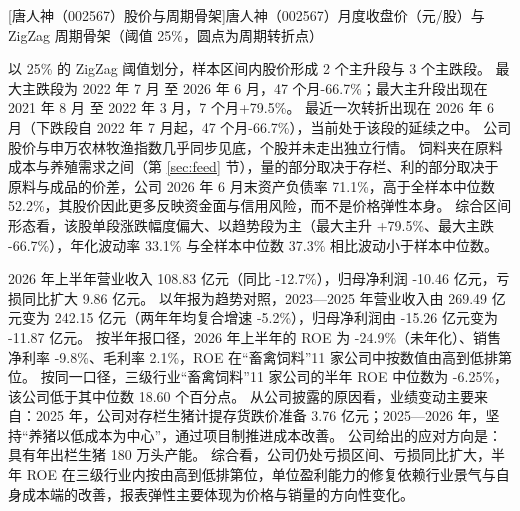 \begin{center}
\begin{minipage}{\textwidth}\centering
{}

[唐人神（002567）股价与周期骨架]{唐人神（002567）月度收盘价（元/股）与 ZigZag 周期骨架（阈值 25\%，圆点为周期转折点）}
\end{minipage}
\end{center}

 以 25\% 的 ZigZag 阈值划分，样本区间内股价形成 2 个主升段与 3 个主跌段。 最大主跌段为 2022 年 7 月 至 2026 年 6 月，47 个月-66.7\%；最大主升段出现在 2021 年 8 月 至 2022 年 3 月，7 个月+79.5\%。 最近一次转折出现在 2026 年 6 月（下跌段自 2022 年 7 月起，47 个月-66.7\%），当前处于该段的延续之中。 公司股价与申万农林牧渔指数几乎同步见底，个股并未走出独立行情。 饲料夹在原料成本与养殖需求之间（第 \ref{sec:feed} 节），量的部分取决于存栏、利的部分取决于原料与成品的价差，公司 2026 年 6 月末资产负债率 71.1\%，高于全样本中位数 52.2\%，其股价因此更多反映资金面与信用风险，而不是价格弹性本身。 综合区间形态看，该股单段涨跌幅度偏大、以趋势段为主（最大主升 +79.5\%、最大主跌 -66.7\%），年化波动率 33.1\% 与全样本中位数 37.3\% 相比波动小于样本中位数。

 2026 年上半年营业收入 108.83 亿元（同比 -12.7\%），归母净利润 -10.46 亿元，亏损同比扩大 9.86 亿元。 以年报为趋势对照，2023---2025 年营业收入由 269.49 亿元变为 242.15 亿元（两年年均复合增速 -5.2\%），归母净利润由 -15.26 亿元变为 -11.87 亿元。 按半年报口径，2026 年上半年的 ROE 为 -24.9\%（未年化）、销售净利率 -9.8\%、毛利率 2.1\%，ROE 在“畜禽饲料”11 家公司中按数值由高到低排第位。 按同一口径，三级行业“畜禽饲料”11 家公司的半年 ROE 中位数为 -6.25\%，该公司低于其中位数 18.60 个百分点。 从公司披露的原因看，业绩变动主要来自：2025 年，公司对存栏生猪计提存货跌价准备 3.76 亿元；2025---2026 年，坚持“养猪以低成本为中心”，通过项目制推进成本改善。 公司给出的应对方向是：具有年出栏生猪 180 万头产能。 综合看，公司仍处亏损区间、亏损同比扩大，半年 ROE 在三级行业内按由高到低排第位，单位盈利能力的修复依赖行业景气与自身成本端的改善，报表弹性主要体现为价格与销量的方向性变化。

